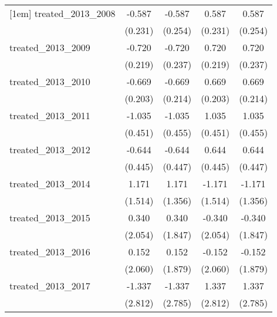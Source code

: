 {\begin{tabular}{l*{4}{c}}
[1em]
treated\_2013\_2008&      -0.587\sym{*}  &      -0.587\sym{*}  &       0.587\sym{*}  &       0.587\sym{*}  \\
            &     (0.231)         &     (0.254)         &     (0.231)         &     (0.254)         \\
[1em]
treated\_2013\_2009&      -0.720\sym{**} &      -0.720\sym{**} &       0.720\sym{**} &       0.720\sym{**} \\
            &     (0.219)         &     (0.237)         &     (0.219)         &     (0.237)         \\
[1em]
treated\_2013\_2010&      -0.669\sym{***}&      -0.669\sym{**} &       0.669\sym{***}&       0.669\sym{**} \\
            &     (0.203)         &     (0.214)         &     (0.203)         &     (0.214)         \\
[1em]
treated\_2013\_2011&      -1.035\sym{*}  &      -1.035\sym{*}  &       1.035\sym{*}  &       1.035\sym{*}  \\
            &     (0.451)         &     (0.455)         &     (0.451)         &     (0.455)         \\
[1em]
treated\_2013\_2012&      -0.644         &      -0.644         &       0.644         &       0.644         \\
            &     (0.445)         &     (0.447)         &     (0.445)         &     (0.447)         \\
[1em]
treated\_2013\_2014&       1.171         &       1.171         &      -1.171         &      -1.171         \\
            &     (1.514)         &     (1.356)         &     (1.514)         &     (1.356)         \\
[1em]
treated\_2013\_2015&       0.340         &       0.340         &      -0.340         &      -0.340         \\
            &     (2.054)         &     (1.847)         &     (2.054)         &     (1.847)         \\
[1em]
treated\_2013\_2016&       0.152         &       0.152         &      -0.152         &      -0.152         \\
            &     (2.060)         &     (1.879)         &     (2.060)         &     (1.879)         \\
[1em]
treated\_2013\_2017&      -1.337         &      -1.337         &       1.337         &       1.337         \\
            &     (2.812)         &     (2.785)         &     (2.812)         &     (2.785)         \\

\end{tabular}}
